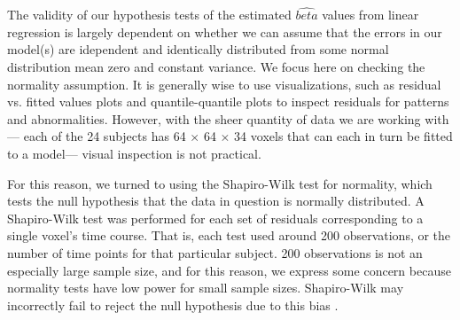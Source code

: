 \par \indent The validity of our hypothesis tests of the estimated 
$\hat{beta}$ values from linear regression is largely dependent on whether we 
can assume that the errors in our model(s) are idependent and identically 
distributed from some normal distribution mean zero and constant variance. 
We focus here on checking the normality assumption. It is generally wise to 
use visualizations, such as residual vs. fitted values plots and 
quantile-quantile plots to inspect residuals for patterns and abnormalities. 
However, with the sheer quantity of data we are working with--- each of the 
24 subjects has 64 $\times$ 64 $\times$ 34 voxels that can each in turn be 
fitted to a model--- visual inspection is not practical. 

For this reason, we turned to using the Shapiro-Wilk test for normality, 
which tests the null hypothesis that the data in question is normally 
distributed. A Shapiro-Wilk test was performed for each set of residuals 
corresponding to a single voxel's time course. That is, each test used around 
200 observations, or the number of time points for that particular subject. 
200 observations is not an especially large sample size, and for this reason, 
we express some concern because normality tests have low power for small sample 
sizes. Shapiro-Wilk may incorrectly fail to reject the null hypothesis due to 
this bias \cite{ghasemi2012normality}. 
